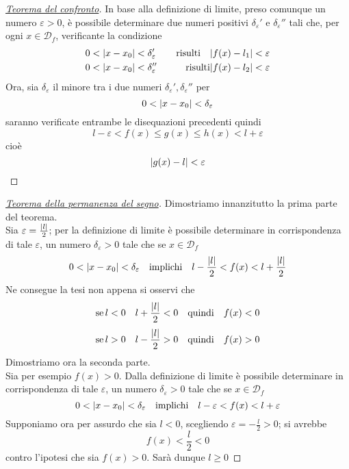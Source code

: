 \begin{proof}[\protect\hyperlink{teor:confLim}{Teorema del confronto}]
	In base alla definizione di limite, preso comunque un numero $\varepsilon>0$, è possibile 
	determinare due numeri positivi $\delta_\varepsilon'$ e $\delta_\varepsilon''$ tali che, per ogni
	$x\in\mathscr{D}_f$, verificante la condizione
	\begin{alignat*}{2}
	0&<\lvert x-x_0\rvert<\delta_\varepsilon' &\quad\text{risulti}\quad \lvert f(x)-l_1\rvert<\varepsilon\\
	0&<\lvert x-x_0\rvert<\delta_\varepsilon'' &\text{risulti} \lvert f(x)-l_2\rvert<\varepsilon\\
	\end{alignat*}
	Ora, sia $\delta_\varepsilon$ il minore tra i due numeri $\delta_\varepsilon',\delta_\varepsilon''$
	per
	\begin{equation*}
	0<\lvert x-x_0\rvert<\delta_\varepsilon
	\end{equation*}
	saranno verificate entrambe le disequazioni precedenti quindi
	\begin{equation*}
	l-\varepsilon<f(x)\leq g(x)\leq h(x)<l+\varepsilon
	\end{equation*}
	cioè
	\begin{equation*}
	\lvert g(x)-l\rvert<\varepsilon
	\end{equation*}
\end{proof}

\begin{proof}[\protect\hyperlink{teor:segno}{Teorema della permanenza del segno}]
	Dimostriamo innanzitutto la prima parte del teorema.\\
	Sia $\varepsilon=\frac{\lvert l\rvert}{2}$; per la definizione di limite è possibile determinare in 
	corrispondenza di tale $\varepsilon$, un numero $\delta_\varepsilon>0$ tale che se 
	$x\in\mathscr{D}_f$
	\begin{equation*}
	0<\lvert x-x_0\rvert<\delta_\varepsilon\quad\text{implichi}\quad
	l-\frac{\lvert l\rvert}{2}<f(x)<l+\frac{\lvert l\rvert}{2}
	\end{equation*}
	Ne consegue la tesi non appena si osservi che
	\begin{equation*}
	\text{se}\, l<0\quad l+\frac{\lvert l\rvert}{2}<0\quad\text{quindi}\quad f(x)<0
	\end{equation*}
	\begin{equation*}
	\text{se}\, l>0\quad l-\frac{\lvert l\rvert}{2}>0\quad\text{quindi}\quad f(x)>0
	\end{equation*}
	Dimostriamo ora la seconda parte.\\
	Sia per esempio $f(x)>0$. Dalla definizione di limite è possibile determinare in 
	corrispondenza di tale $\varepsilon$, un numero $\delta_\varepsilon>0$ tale che se 
	$x\in\mathscr{D}_f$
	\begin{equation*}
	0<\lvert x-x_0\rvert<\delta_\varepsilon\quad\text{implichi}\quad
	l-\varepsilon<f(x)<l+\varepsilon
	\end{equation*}
	Supponiamo ora per assurdo che sia $l<0$, scegliendo $\varepsilon=-\frac{l}{2}>0$; si avrebbe
	\begin{equation*}
	f(x)<\frac{l}{2}<0
	\end{equation*}
	contro l'ipotesi che sia $f(x)>0$. Sarà dunque $l\geq0$
\end{proof}


